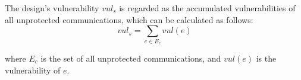 \documentclass[10pt,journal, compsoc]{IEEEtran}
\begin{document}
The design's vulnerability $vul_s$ is regarded as the accumulated vulnerabilities of all unprotected communications, which can be calculated as follows:
\begin{equation}
vul_s=\sum \limits_{e\in E_c}vul(e)
\end{equation}

\noindent where $E_c$ is the set of all unprotected communications, and $vul(e)$ is the vulnerability of $e$.%













\end{document}
